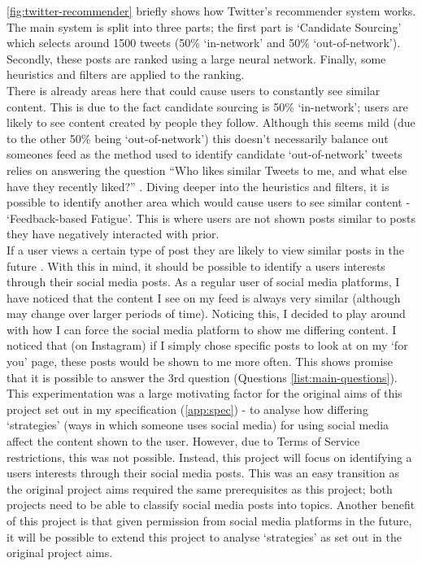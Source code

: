 \cref{fig:twitter-recommender} briefly shows how Twitter's recommender system works. The main system is split into three parts;
the first part is `Candidate Sourcing' which selects around 1500 tweets (50\% `in-network' and 50\% `out-of-network'). Secondly,
these posts are ranked using a large neural network. Finally, some heuristics and filters are applied to the ranking.\\
There is already areas here that could cause users to constantly see similar content. This is due to the fact candidate sourcing
is 50\% `in-network'; users are likely to see content created by people they follow. Although this seems mild (due to the other
50\% being `out-of-network') this doesn't necessarily balance out someones feed as the method used to identify candidate
`out-of-network' tweets relies on answering the question ``Who likes similar Tweets to me, and what else have they recently liked?'' \cite{twitter-rec}.
Diving deeper into the heuristics and filters, it is possible to identify another area which would cause users to see similar content
- `Feedback-based Fatigue'. This is where users are not shown posts similar to posts they have negatively interacted with prior.\\
If a user views a certain type of post they are likely to view similar posts in the future \cite{twitter-rec}. With this in mind, it should be possible
to identify a users interests through their social media posts. As a regular user of social media platforms, I have noticed that
the content I see on my feed is always very similar (although may change over larger periods of time). Noticing this, I decided to
play around with how I can force the social media platform to show me differing content. I noticed that (on Instagram) if I simply
chose specific posts to look at on my `for you' page, these posts would be shown to me more often. This shows promise that it is
possible to answer the 3rd question (Questions \ref{list:main-questions}). This experimentation was a large motivating factor
for the original aims of this project set out in my specification (\cref{app:spec}) - to analyse how differing
`strategies' (ways in which someone uses social media) for using social media affect the content shown to the user. However, due to Terms of Service restrictions, this was not
possible. Instead, this project will focus on identifying a users interests through their social media posts. This was an easy transition
as the original project aims required the same prerequisites as this project; both projects need to be able to classify social media posts
into topics. Another benefit of this project is that given permission from social media platforms in the future, it will be possible to
extend this project to analyse `strategies' as set out in the original project aims.\\

